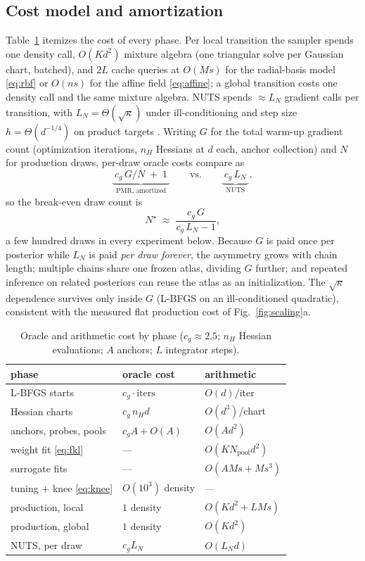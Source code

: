 \documentclass[10pt,journal,compsoc]{IEEEtran}
\begin{document}
\subsection{Cost model and amortization}\label{sec:cost}
Table~\ref{tab:cost} itemizes the cost of every phase. Per local
transition the sampler spends one density call, $O(Kd^2)$ mixture algebra
(one triangular solve per Gaussian chart, batched), and $2L$ cache queries
at $O(Ms)$ for the radial-basis model \eqref{eq:rbf} or $O(ns)$ for the
affine field \eqref{eq:affine}; a global transition costs one density call
and the same mixture algebra. NUTS spends $\approx L_N$ gradient calls per
transition, with $L_N=\Theta(\sqrt\kappa)$ under ill-conditioning
\cite{neal2011,langmore2019} and step size $h=\Theta(d^{-1/4})$ on product
targets \cite{beskos2013}. Writing $G$ for the total warm-up gradient count
(optimization iterations, $n_H$ Hessians at $d$ each, anchor collection)
and $N$ for production draws, per-draw oracle costs compare as
\begin{equation}
\underbrace{\;c_g\,G/N \;+\; 1\;}_{\text{PMR, amortized}}
\qquad\text{vs.}\qquad
\underbrace{\;c_g\,L_N\;}_{\text{NUTS}},
\label{eq:amort}
\end{equation}
so the break-even draw count is
\begin{equation}
N^\star\;\approx\;\frac{c_g\,G}{c_g\,L_N-1},
\label{eq:breakeven}
\end{equation}
a few hundred draws in every experiment below. Because $G$ is paid once
per posterior while $L_N$ is paid \emph{per draw forever}, the asymmetry
grows with chain length; multiple chains share one frozen atlas, dividing
$G$ further; and repeated inference on related posteriors can reuse the
atlas as an initialization. The $\sqrt\kappa$ dependence survives only
inside $G$ (L-BFGS on an ill-conditioned quadratic), consistent with the
measured flat production cost of Fig.~\ref{fig:scaling}a.

\begin{table}[t]
\caption{Oracle and arithmetic cost by phase ($c_g\!\approx\!2.5$;
$n_H$ Hessian evaluations; $A$ anchors; $L$ integrator steps).}
\label{tab:cost}
\centering\small
\setlength{\tabcolsep}{3pt}
\begin{tabular}{lll}
\toprule
phase & oracle cost & arithmetic \\
\midrule
L-BFGS starts & $c_g\cdot\text{iters}$ & $O(d)$/iter \\
Hessian charts & $c_g\,n_H d$ & $O(d^3)$/chart \\
anchors, probes, pools & $c_g A + O(A)$ & $O(Ad^2)$ \\
weight fit \eqref{eq:fkl} & --- & $O(KN_{\mathrm{pool}}d^2)$ \\
surrogate fits & --- & $O(AMs+Ms^3)$ \\
tuning + knee \eqref{eq:knee} & $O(10^3)$ density & --- \\
\midrule
production, local & $1$ density & $O(Kd^2{+}LMs)$ \\
production, global & $1$ density & $O(Kd^2)$ \\
NUTS, per draw & $c_gL_N$ & $O(L_Nd)$ \\
\bottomrule
\end{tabular}
\end{table}
\end{document}
